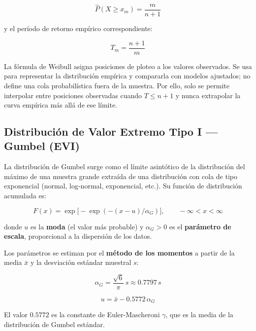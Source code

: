 \documentclass[11pt]{article}
\begin{document}
\begin{equation}
  \hat{P}(X \geq x_m) = \frac{m}{n+1}
  \label{eq:weibull}
\end{equation}

y el período de retorno empírico correspondiente:

\begin{equation}
  T_m = \frac{n+1}{m}
  \label{eq:T_empirico}
\end{equation}

La fórmula de Weibull asigna posiciones de ploteo a los valores observados. Se usa
para representar la distribución empírica y compararla con modelos ajustados; no
define una cola probabilística fuera de la muestra. Por ello, solo se permite
interpolar entre posiciones observadas cuando $T\leq n+1$ y nunca extrapolar la
curva empírica más allá de ese límite.

\subsection*{Distribución de Valor Extremo Tipo I — Gumbel (EVI)}

La distribución de Gumbel surge como el límite asintótico de la distribución del
máximo de una muestra grande extraída de una distribución con cola de tipo exponencial
(normal, log-normal, exponencial, etc.).  Su función de distribución acumulada es:

\begin{equation}
  F(x) = \exp\!\bigl[-\exp(-(x-u)/\alpha_G)\bigr], \qquad -\infty < x < \infty
  \label{eq:gumbel_cdf}
\end{equation}

donde $u$ es la \textbf{moda} (el valor más probable) y $\alpha_G > 0$ es el
\textbf{parámetro de escala}, proporcional a la dispersión de los datos.

Los parámetros se estiman por el \textbf{método de los momentos} a partir de la
media $\bar{x}$ y la desviación estándar muestral $s$:

\begin{equation}
  \alpha_G = \frac{\sqrt{6}}{\pi}\,s \approx 0.7797\,s
  \label{eq:alpha}
\end{equation}

\begin{equation}
  u = \bar{x} - 0.5772\,\alpha_G
  \label{eq:u}
\end{equation}

El valor $0.5772$ es la constante de Euler-Mascheroni $\gamma$, que es la media
de la distribución de Gumbel estándar.
\end{document}
